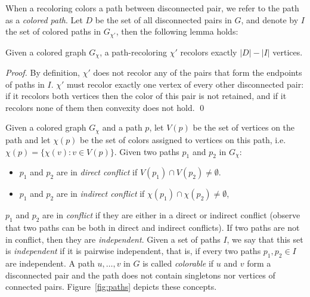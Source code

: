 When a recoloring colors a path between disconnected pair, 
we refer to the path as a \emph{colored path}.
%
Let $D$ be the set of all disconnected pairs in $G$, 
and denote by $I$ the set of colored paths in $G_{\chi'}$, 
then the following lemma holds:

\begin{lemma}
\label{lm:cost}
Given a colored graph $G_\chi$, 
a path-recoloring $\chi'$ recolors exactly $|D| - |I|$ vertices.
\end{lemma}

\begin{proof}
By definition,
$\chi'$ does not recolor any of the pairs that form the endpoints of paths in $I$.
%
$\chi'$ must recolor exactly one vertex of every other disconnected pair:
if it recolors both vertices then the color of this pair is not retained,
and if it recolors none of them then convexity does not hold.
\qed{}\end{proof}

Given a colored graph $G_\chi$ and a path $p$, 
let $V(p)$ be the set of vertices on the path and let $\chi(p)$ 
be the set of colors assigned to vertices on this path, 
i.e. $\chi(p) = {\{\chi(v) : v \in V(p)\}}$.
%
Given two paths $p_1$ and $p_2$ in $G_\chi$:
\begin{itemize}
\item 
$p_1$ and $p_2$ are in \emph{direct conflict} if $V(p_1) \cap V(p_2) \neq \emptyset$.

\item 
$p_1$ and $p_2$ are in \emph{indirect conflict} if $\chi(p_1) \cap \chi(p_2) \neq \emptyset$,
\end{itemize}
%
$p_1$ and $p_2$ are in \emph{conflict} if they are either in a direct
or indirect conflict (observe that two paths can be both in direct and
indirect conflicts).
%
If two paths are not in conflict, 
then they are \emph{independent}.
%
Given a set of paths $I$, 
we say that this set is \emph{independent}
if it is pairwise independent, 
that is, 
if every two paths $p_1, p_2 \in I$ are independent.
%
A path $u, \dots, v$ in $G$ is called \emph{colorable} if $u$ and $v$
form a disconnected pair and the path does not contain singletons nor
vertices of connected pairs.
%
Figure~\ref{fig:paths} depicts these concepts.

